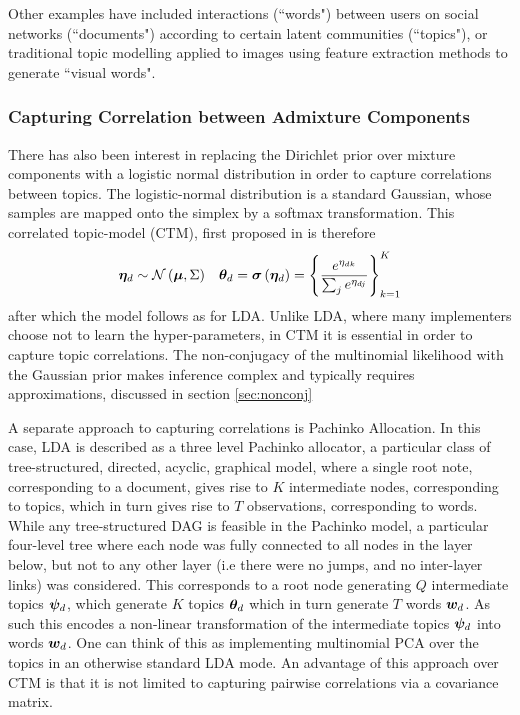 Other examples have included interactions (``words") between users on social networks (``documents") according to certain latent communities (``topics")\cite{Zhang2007}, or traditional topic modelling applied to images\cite{Philbin2008} using feature extraction methods to generate ``visual words". 

\subsubsection{Capturing Correlation between Admixture Components}

There has also been interest in replacing the Dirichlet prior over mixture components with a logistic normal distribution in order to capture correlations between topics. The logistic-normal distribution is a standard Gaussian, whose samples are mapped onto the simplex by a softmax transformation. This correlated topic-model (CTM), first proposed in \cite{Blei2006} is therefore
\begin{align}
\bm \eta_d & \sim \mathcal{N} \left( {\bm \mu}, {\Sigma} \right) & { \bm \theta_d } = \bm \sigma\left(\bm \eta_d\right) = \left\{\frac{e^{\eta_{dk}}}{\sum_j e^{\eta_{dj}}}\right\}_{k=1}^K
\end{align}
after which the model follows as for LDA. Unlike LDA, where many implementers choose not to learn the hyper-parameters, in CTM it is essential in order to capture topic correlations. The non-conjugacy of the multinomial likelihood with the Gaussian prior makes inference complex and typically requires approximations, discussed in section \ref{sec:nonconj}

A separate approach to capturing correlations is Pachinko Allocation\cite{Li2006}. In this case, LDA is described as a three level Pachinko allocator, a particular class of tree-structured, directed, acyclic, graphical model, where a single root note, corresponding to a document, gives rise to $K$ intermediate nodes, corresponding to topics, which in turn gives rise to $T$ observations, corresponding to words. While any tree-structured DAG is feasible in the Pachinko model, a particular four-level tree where each node was fully connected to all nodes in the layer below, but not to any other layer (i.e there were no jumps, and no inter-layer links) was considered. This corresponds to a root node generating $Q$ intermediate topics $\bm \psi_d$, which generate $K$ topics ${ \bm \theta_d }$ which in turn generate $T$ words ${ \bm w_d }$. As such this encodes a non-linear transformation of the intermediate topics $\bm \psi_d$ into words ${ \bm w_d }$. One can think of this as implementing multinomial PCA over the topics in an otherwise standard LDA mode. An advantage of this approach over CTM is that it is not limited to capturing pairwise correlations via a covariance matrix.

